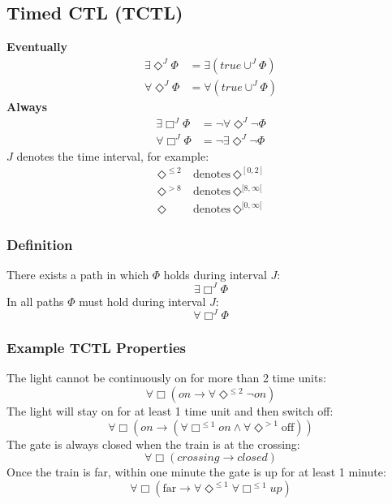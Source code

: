 \documentclass[11pt]{article}
\theoremstyle{definition}
\begin{document}
\subsection{Timed CTL (TCTL)}
\textbf{Eventually}
\begin{align*}
\exists \Diamond^{J} \Phi &= \exists(true \cup^{J} \Phi) \\
\forall \Diamond^{J} \Phi &= \forall(true \cup^{J} \Phi)
\end{align*}
\textbf{Always}
\begin{align*}
\exists \Box^{J} \Phi &= \neg \forall \Diamond^{J} \neg \Phi \\
\forall \Box^{J} \Phi &= \neg \exists \Diamond^{J} \neg \Phi 
\end{align*}
$J$ denotes the time interval, for example:
\begin{align*}
\Diamond^{\leq 2}\ &\text{denotes}\ \Diamond^{[0,2]} \\
\Diamond^{>8}\ &\text{denotes}\ \Diamond^{[8,\infty[} \\
\Diamond\ &\text{denotes}\ \Diamond^{[0,\infty[}
\end{align*}
\subsubsection{Definition}
There exists a path in which $\Phi$ holds during interval $J$:
\begin{equation}
\exists \Box^{J} \Phi
\end{equation}
In all paths $\Phi$ must hold during interval $J$:
\begin{equation}
\forall \Box^{J} \Phi
\end{equation}

\subsubsection{Example TCTL Properties}
The light cannot be continuously on for more than 2 time units:
\begin{equation}
\forall \Box (on \rightarrow \forall \Diamond^{\leq 2} \neg on)
\end{equation}
The light will stay on for at least 1 time unit and then switch off:
\begin{equation}
\forall \Box (on \rightarrow (\forall \Box^{\leq 1} on \wedge \forall \Diamond^{>1} \text{off}))
\end{equation}
The gate is always closed when the train is at the crossing:
\begin{equation}
\forall \Box (crossing \rightarrow closed)
\end{equation}
Once the train is far, within one minute the gate is up for at least 1 minute:
\begin{equation}
\forall \Box (\text{far} \rightarrow \forall \Diamond^{\leq 1} \forall \Box^{\leq 1} up)
\end{equation}
\end{document}
